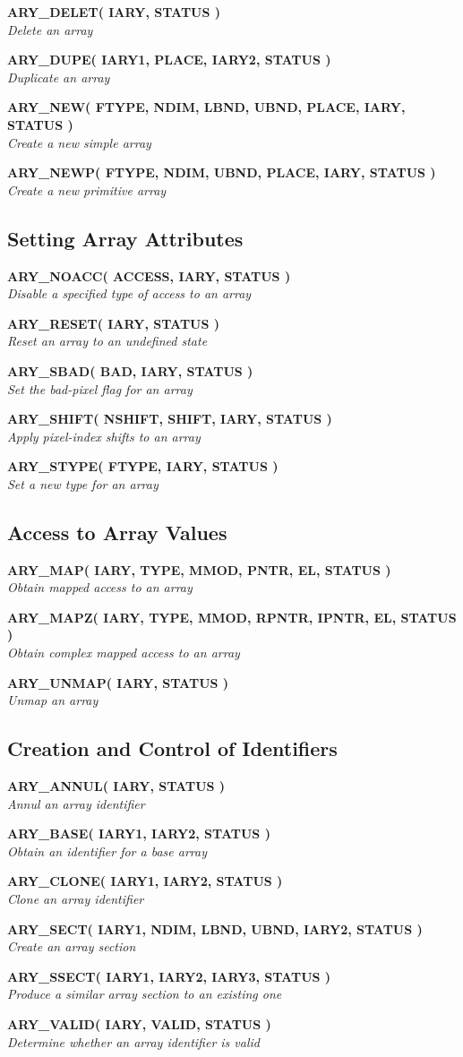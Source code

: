 \documentclass[twoside,11pt]{article}
\newcommand{\xlabel}[1]{}
\newcommand{\noteroutine}[2]{\textbf{#1}\hspace*{\fill}\nopagebreak \\
                             \hspace*{3em}\emph{#2}\hspace*{\fill}\par}
\begin{document}
\noteroutine{ARY\_DELET( IARY, STATUS )}
            {Delete an array}
\noteroutine{ARY\_DUPE( IARY1, PLACE, IARY2, STATUS )}
            {Duplicate an array}
\noteroutine{ARY\_NEW( FTYPE, NDIM, LBND, UBND, PLACE, IARY, STATUS )}
            {Create a new simple array}
\noteroutine{ARY\_NEWP( FTYPE, NDIM, UBND, PLACE, IARY, STATUS )}
            {Create a new primitive array}


\subsection{\xlabel{setting_array_attributes}Setting Array Attributes}
\label{setting_array_attributes}

\noteroutine{ARY\_NOACC( ACCESS, IARY, STATUS )}
            {Disable a specified type of access to an array}
\noteroutine{ARY\_RESET( IARY, STATUS )}
            {Reset an array to an undefined state}
\noteroutine{ARY\_SBAD( BAD, IARY, STATUS )}
            {Set the bad-pixel flag for an array}
\noteroutine{ARY\_SHIFT( NSHIFT, SHIFT, IARY, STATUS )}
            {Apply pixel-index shifts to an array}
\noteroutine{ARY\_STYPE( FTYPE, IARY, STATUS )}
            {Set a new type for an array}


\subsection{\xlabel{access_to_array_values}Access to Array Values}
\label{access_to_array_values}

\noteroutine{ARY\_MAP( IARY, TYPE, MMOD, PNTR, EL, STATUS )}
            {Obtain mapped access to an array}
\noteroutine{ARY\_MAPZ( IARY, TYPE, MMOD, RPNTR, IPNTR, EL, STATUS )}
            {Obtain complex mapped access to an array}
\noteroutine{ARY\_UNMAP( IARY, STATUS )}
            {Unmap an array}


\subsection{\xlabel{creation_and_control_of_identifiers}%
Creation and Control of Identifiers}
\label{creation_and_control_of_identifiers}

\noteroutine{ARY\_ANNUL( IARY, STATUS )}
            {Annul an array identifier}
\noteroutine{ARY\_BASE( IARY1, IARY2, STATUS )}
            {Obtain an identifier for a base array}
\noteroutine{ARY\_CLONE( IARY1, IARY2, STATUS )}
            {Clone an array identifier}
\noteroutine{ARY\_SECT( IARY1, NDIM, LBND, UBND, IARY2, STATUS )}
            {Create an array section}
\noteroutine{ARY\_SSECT( IARY1, IARY2, IARY3, STATUS )}
            {Produce a similar array section to an existing one}
\noteroutine{ARY\_VALID( IARY, VALID, STATUS )}
            {Determine whether an array identifier is valid}
\end{document}
